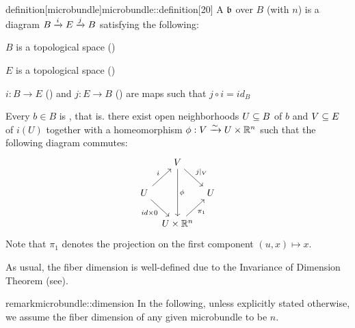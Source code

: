 \begin{mystatement}{definition}[microbundle]{microbundle::definition}[20] A  $\bb$ over $B$ (with  $n$) is a diagram $\bundle{B}{E}{i}{j}$ satisfying the following: \begin{properties} \item $B$ is a topological space () \item $E$ is a topological space () \item $i: B \to E$ () and $j: E \to B$ () are maps such that $j \circ i = id_B$ \item Every $b \in B$ is , that is. there exist open neighborhoods $U \sub B$ of $b$ and $V \sub E$ of $i(U)$ together with a homeomorphism $\phi: V \isomto U \cross \R^n$ such that the following diagram commutes: \[ \begin{tikzcd}[column sep=tiny] & V \ar[dr, "j\vert_V"] \ar[dd, "\phi"] & \\ U \ar[ur, "i"] \ar[dr, "{id \cross 0}"'] & & U \\ & U \cross\R^n \ar[ur, "\pi_1"'] & \end{tikzcd} \] Note that $\pi_1$ denotes the projection on the first component $(u, x) \mapsto x$. \end{properties} \end{mystatement}

As usual, the fiber dimension is well-defined due to the Invariance of Dimension Theorem (see\cite[cor.19.10]{brendon}). \begin{mystatement}{remark}{microbundle::dimension} In the following, unless explicitly stated otherwise, we assume the fiber dimension of any given microbundle to be $n$. \end{mystatement}